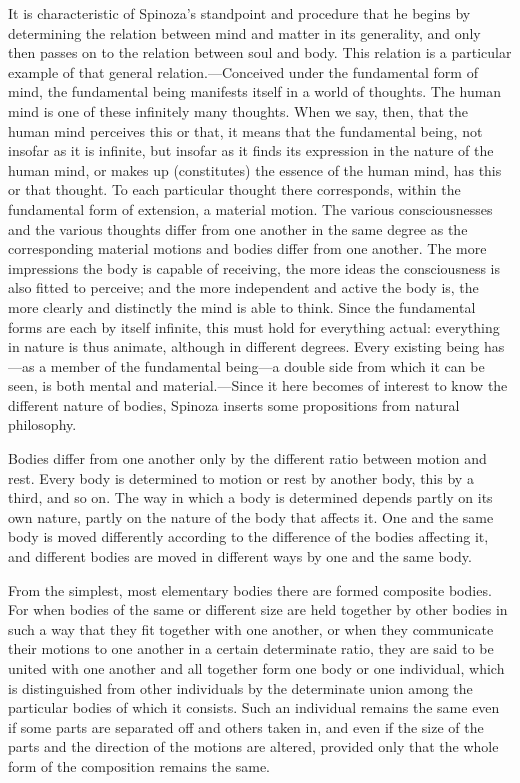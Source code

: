 \documentclass[12pt]{book}
\newcommand{\opage}[1]{\marginnote{\footnotesize\textit{[#1]}}}
\begin{document}
It is characteristic of Spinoza's standpoint and procedure that he begins by
determining the relation between mind and matter in its generality, and only then
passes on to the relation between soul and body. This relation is a particular example
of that general relation.---Conceived under the fundamental form of mind, the
fundamental being manifests itself in a world of thoughts. The human mind is one of
these infinitely many thoughts. When we say, then, that the human mind perceives this or
that, it means that the fundamental being, not insofar as it is \opage{91}infinite, but
insofar as it finds its expression in the nature of the human mind, or makes up
(constitutes) the essence of the human mind, has this or that thought. To each
particular thought there corresponds, within the fundamental form of extension, a
material motion. The various consciousnesses and the various thoughts differ from one
another in the same degree as the corresponding material motions and bodies differ from
one another. The more impressions the body is capable of receiving, the more ideas the
consciousness is also fitted to perceive; and the more independent and active the body
is, the more clearly and distinctly the mind is able to think. Since the fundamental
forms are each by itself infinite, this must hold for everything actual: everything in
nature is thus animate, although in different degrees. Every existing being
has---as a member of the fundamental being---a double side from which it can be seen,
is both mental and material.---Since it here becomes of interest to know the different
nature of bodies, Spinoza inserts some propositions from natural philosophy.

Bodies differ from one another only by the different ratio between motion and rest.
Every body is determined to motion or rest by another body, this by a third, and so on.
The way in which a body is determined depends partly on its own nature, partly on the
nature of the body that affects it. One and the same body is moved differently
according to the difference of the bodies affecting it, and different bodies are moved
in different ways by one and the same body.

From the simplest, most elementary bodies there are formed \opage{92}composite bodies.
For when bodies of the same or different size are held together by other bodies in such
a way that they fit together with one another, or when they communicate their motions to
one another in a certain determinate ratio, they are said to be united with one another
and all together form one body or one individual, which is distinguished from other
individuals by the determinate union among the particular bodies of which it consists.
Such an individual remains the same even if some parts are separated off and others
taken in, and even if the size of the parts and the direction of the motions are
altered, provided only that the whole form of the composition remains the same.
\end{document}
